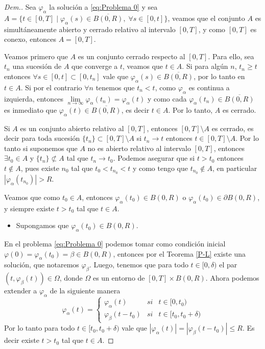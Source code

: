  \begin{proof}[Dem.] Sea $\varphi_\alpha$  la solución a \ref{eq:Problema 0} y sea $A=\{t\in [0,T] \mid \varphi_\alpha(s)\in \overline{B(0,R)}, \; \forall s\in [0,t]\}$, veamos que el conjunto $A$ es simultáneamente abierto y cerrado relativo al intervalo $[0,T]$, y  como $[0,T]$ es conexo, entonces $A=[0,T]$.
  
 Veamos primero que  $A$  es un conjunto cerrado respecto al $[0,T]$. Para ello, sea   $t_n$  una sucesión de $A$ que converge a $t$, veamos que $t\in A$.  Si para algún $n$, $t_n\geq t$ entonces $\forall s \in [0,t]\subset [0,t_n] $ vale que $\varphi_\alpha(s)\in\overline{B(0,R)}$,  por lo tanto en $t\in A$.  Si por el contrario $\forall n$ tenemos que $t_n < t$,  como $\varphi_\alpha$ es continua a izquierda, entonces $\lim\limits_{n\to \infty}\varphi_\alpha(t_n)=\varphi_\alpha(t)$ y como cada $\varphi_\alpha(t_n)\in \overline{B(0,R)}$ es inmediato que $\varphi_\alpha(t)\in \overline{B(0,R)}$, es decir $t\in A$.  Por lo tanto, $A$ es cerrado.
 	 
  	Si $A$ es un conjunto abierto relativo al $[0,T]$, entonces $[0,T]\setminus A$ es cerrado, es decir para toda sucesión $\{t_n\}\subset [0,T]\setminus A$ si $t_n\to t$ entonces $t\in[0,T]\setminus A$. Por lo tanto si suponemos que  $A$ no es abierto relativo al intervalo $[0,T]$, entonces $\exists t_0\in A$ y $\{t_n\}\nsubset A$ tal que $t_n\to t_0$. Podemos asegurar que si $t> t_0$ entonces $t\notin A$, pues existe $n_0$ tal que $t_0<t_{n_0}<t$ y como tengo que $t_{n_0}\notin A$, en particular $|\varphi_\alpha(t_{n_0})|>R$.
   
   Veamos que como $t_0\in A$, entonces $\varphi_\alpha(t_0)\in B(0,R)$ o  $\varphi_\alpha(t_0)\in \partial B(0,R) $, y siempre existe $t> t_0$ tal que $t\in A$.%
 		\begin{itemize}
   		\item Supongamos que $\varphi_\alpha(t_0)\in B(0,R)$.
     \end{itemize}
En el problema \eqref{eq:Problema 0} podemos tomar como condición inicial $\varphi(0)=\varphi_\alpha(t_0)=\beta\in B(0,R)$, entonces por el Teorema \ref{P-L} existe una solución, que notaremos  $\varphi_{\beta}$. Luego, tenemos que para todo $t\in [0,\delta)$ el par $(t,\varphi_\beta(t))\in \Omega$, donde  $\Omega$ es un entorno de $[0,T]\times B(0,R)$. Ahora podemos extender a $\varphi_\alpha $ de la siguiente manera
$$\varphi_\alpha(t)=\left\{\begin{array}{ccc}
    \varphi_\alpha(t) & si &  t\in[0,t_0)\\
     \varphi_\beta(t-t_0) & si &t\in[t_0,t_0+\delta) 
\end{array}\right.$$
Por lo tanto para todo $t\in[t_0,t_0+\delta)$ vale que $|\varphi_\alpha(t)|=|\varphi_\beta(t-t_0)|\leq R$. Es decir existe $t>t_0$ tal que $t\in A$.


\end{proof}
